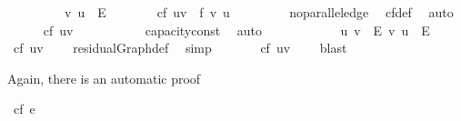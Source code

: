 \begin{isabellebody}
\ \isamarkupfalse%
\ \isacommand{{\isacharbraceleft}}\isamarkupfalse%
\isanewline
\ \ \ \ \isamarkupfalse%
\ {\isachardoublequoteopen}{\isacharparenleft}v{\isacharcomma}\ u{\isacharparenright}\ {\isasymin}\ E{\isachardoublequoteclose}\isanewline
\ \ \ \ \isamarkupfalse%
\ \isamarkupfalse%
\ {\isachardoublequoteopen}cf\ {\isacharparenleft}u{\isacharcomma}v{\isacharparenright}\ {\isacharequal}\ f\ {\isacharparenleft}v{\isacharcomma}\ u{\isacharparenright}{\isachardoublequoteclose}\ \isanewline
\ \ \ \ \ \ \isamarkupfalse%
\ no{\isacharunderscore}parallel{\isacharunderscore}edge\ \isamarkupfalse%
\ cf{\isacharunderscore}def\ \isamarkupfalse%
\ auto\isanewline
\ \ \ \ \isamarkupfalse%
\ {\isachardoublequoteopen}cf\ {\isacharparenleft}u{\isacharcomma}v{\isacharparenright}\ {\isasymge}\ {}{\isachardoublequoteclose}\ \isanewline
\ \ \ \ \ \ \isamarkupfalse%
\ capacity{\isacharunderscore}const\ \isamarkupfalse%
\ auto\isanewline
\ \ \isacommand{{\isacharbraceright}}\isamarkupfalse%
\ \isamarkupfalse%
\ \isacommand{{\isacharbraceleft}}\isamarkupfalse%
\isanewline
\ \ \ \ \isamarkupfalse%
\ {\isachardoublequoteopen}{\isacharparenleft}u{\isacharcomma}\ v{\isacharparenright}\ {\isasymnotin}\ E{\isachardoublequoteclose}\ {\isachardoublequoteopen}{\isacharparenleft}v{\isacharcomma}\ u{\isacharparenright}\ {\isasymnotin}\ E{\isachardoublequoteclose}\isanewline
\ \ \ \ \isamarkupfalse%
\ {\isachardoublequoteopen}cf\ {\isacharparenleft}u{\isacharcomma}v{\isacharparenright}\ {\isasymge}\ {}{\isachardoublequoteclose}\ \isamarkupfalse%
\ residualGraph{\isacharunderscore}def\ \isamarkupfalse%
\ simp\isanewline
\ \ \isacommand{{\isacharbraceright}}\isamarkupfalse%
\ \isamarkupfalse%
\ \isamarkupfalse%
\ {\isachardoublequoteopen}cf\ {\isacharparenleft}u{\isacharcomma}v{\isacharparenright}\ {\isasymge}\ {}{\isachardoublequoteclose}\ \isamarkupfalse%
\ blast\isanewline
{}\isamarkupfalse%
%
\endisatagproof
{\isafoldproof}%
%
\isadelimproof
%
\endisadelimproof
%
\begin{isamarkuptext}%
Again, there is an automatic proof%
\end{isamarkuptext}\isamarkuptrue%
\isamarkupfalse%
\ {\isachardoublequoteopen}cf\ e\ {\isasymge}\ {}{\isachardoublequoteclose}\isanewline

\end{isabellebody}
